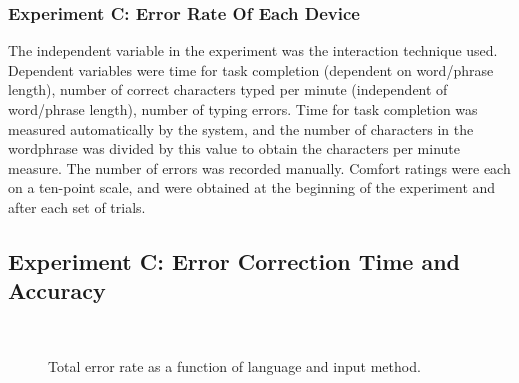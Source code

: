\documentclass{sigchi}
\begin{document}
\subsubsection{Experiment C: Error Rate Of Each Device}
The independent variable in the experiment was the interaction technique used. Dependent variables were time for task completion (dependent on word/phrase length), number of correct characters typed per minute (independent of word/phrase length), number of typing errors. Time for task completion was
measured automatically by the system, and the number of
characters in the wordphrase was divided by this value to
obtain the characters per minute measure. The number of
errors was recorded manually. Comfort ratings were each on a
ten-point scale, and were obtained at the beginning of the
experiment and after each set of trials. 

\subsection{Experiment C: Error Correction Time and Accuracy}






\begin{figure}
\centering
{}



	\caption{Total error rate as a function of language and input method.}
  ~\label{fig:graphErrorRate}
\end{figure}
\end{document}
